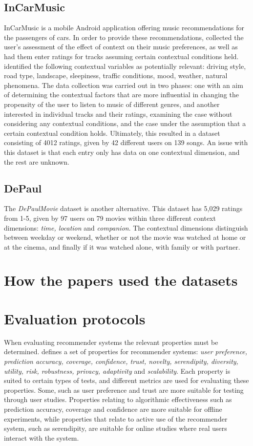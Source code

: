 \subsection{InCarMusic}
InCarMusic is a mobile Android application offering music recommendations for the passengers of cars.
In order to provide these recommendations, \cite{InCarMusic2011} collected the user's assessment of the effect of context on their music preferences, as well as had them enter ratings for tracks assuming certain contextual conditions held.
\cite{InCarMusic2011} identified the following contextual variables as potentially relevant: driving style, road type, landscape, sleepiness, traffic conditions, mood, weather, natural phenomena.
The data collection was carried out in two phases: one with an aim of determining the contextual factors that are more influential in changing the propensity of the user to listen to music of different genres, and another interested in individual tracks and their ratings, examining the case without considering any contextual conditions, and the case under the assumption that a certain contextual condition holds.
Ultimately, this resulted in a dataset consisting of 4012 ratings, given by 42 different users on 139 songs.
An issue with this dataset is that each entry only has data on one contextual dimension, and the rest are unknown.

\subsection{DePaul}
The \textit{DePaulMovie} dataset is another alternative.
This dataset has 5,029 ratings from 1-5, given by 97 users on 79 movies within three different context dimensions: \textit{time, location} and \textit{companion}\cite{DePaulData}.
The contextual dimensions distinguish between weekday or weekend, whether or not the movie was watched at home or at the cinema, and finally if it was watched alone, with family or with partner.

\section{How the papers used the datasets}

\section{Evaluation protocols}
When evaluating recommender systems the relevant properties must be determined.
\cite{RecommenderHandbook2015} defines a set of properties for recommender systems: \textit{user preference, prediction accuracy, coverage, confidence, trust, novelty, serendipity, diversity, utility, risk, robustness, privacy, adaptivity} and \textit{scalability}.
Each property is suited to certain types of tests, and different metrics are used for evaluating these properties.
Some, such as user preference and trust are more suitable for testing through user studies.
Properties relating to algorithmic effectiveness such as prediction accuracy, coverage and confidence are more suitable for offline experiments, while properties that relate to active use of the recommender system, such as serendipity, are suitable for online studies where real users interact with the system.


